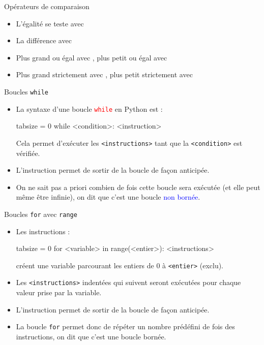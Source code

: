 \documentclass[10pt]{beamer}
\begin{document}
\begin{frame}{\Ctitle}{\stitle}
	\begin{alertblock}{Opérateurs de comparaison}
		\begin{itemize}
			\item<1-> L'égalité se teste avec \kw{==}
			\item<2-> La différence avec \kw{!=}
			\item<3-> Plus grand ou égal avec \kw{>=}, plus petit ou égal avec \kw{<=}
			\item<4-> Plus grand strictement avec \kw{>}, plus petit strictement avec \kw{<}
		\end{itemize}
	\end{alertblock}
\end{frame}

\begin{frame}[fragile]{\Ctitle}{\stitle}
	\begin{alertblock}{Boucles {\tt while}}
		\begin{itemize}
			\item<2-> La syntaxe d'une boucle \textcolor{red}{\tt while}  en Python est :
				\begin{codepython*}{tabsize = 0}
					while <condition>:
					<instruction>
				\end{codepython*}
				Cela permet d'exécuter les {\tt <instructions>} tant que la {\tt <condition>} est  vérifiée.
			\item<3-> L'instruction  permet de sortir de la boucle de façon anticipée.
			\item<4->  On ne sait pas a priori combien de fois cette boucle sera exécutée (et elle peut même être infinie), on dit que c'est une boucle \textcolor{blue}{non bornée}.
		\end{itemize}
	\end{alertblock}
\end{frame}

\begin{frame}[fragile]{\Ctitle}{\stitle}
	\begin{alertblock}{Boucles {\tt for} avec {\tt range}}
		\begin{itemize}
			\item<2-> Les instructions :
				\begin{codepython*}{tabsize = 0}
					for <variable> in range(<entier>):
					<instructions>
				\end{codepython*}
				créent une variable parcourant les entiers de 0 à {\tt <entier>} (exclu).
			\item<3-> Les {\tt <instructions>} indentées qui suivent seront exécutées pour chaque valeur prise par la variable.
			\item<4-> L'instruction  permet de sortir de la boucle de façon anticipée.
			\item<5-> La boucle {\tt for} permet donc de répéter un nombre prédéfini de fois des instructions, on dit que c'est une boucle bornée.
		\end{itemize}
	\end{alertblock}
\end{frame}
\end{document}
